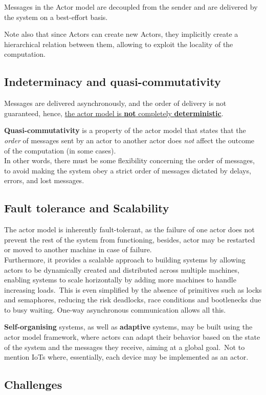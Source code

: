 Messages in the Actor model are decoupled from the sender and are delivered by the system on a best-effort basis.


Note also that since Actors can create new Actors, they implicitly create a hierarchical relation between them, allowing to exploit the locality of the computation.

\subsection{Indeterminacy and quasi-commutativity}
Messages are delivered asynchronously, and the order of delivery is not guaranteed, hence, \ul{the actor model is \textbf{not} completely \textbf{deterministic}}.

\textbf{Quasi-commutativity} is a property of the actor model that states that the \textit{order} of messages sent by an actor to another actor does \textit{not} affect the outcome of the computation (in some cases).\\
In other words, there must be some flexibility concerning the order of messages, to avoid making the system obey a strict order of messages dictated by delays, errors, and lost messages.

\subsection{Fault tolerance and Scalability}
The actor model is inherently fault-tolerant, as the failure of one actor does not prevent the rest of the system from functioning, besides, actor may be restarted or moved to another machine in case of failure.\\
Furthermore, it provides a scalable approach to building systems by allowing actors to be dynamically created and distributed across multiple machines, enabling systems to scale horizontally by adding more machines to handle increasing loads.\
This is even simplified by the absence of primitives such as locks and semaphores, reducing the risk deadlocks, race conditions and bootlenecks due to busy waiting.
One-way asynchronous communication allows all this.

\textbf{Self-organising} systems, as well as \textbf{adaptive} systems, may be built using the actor model framework, where actors can adapt their behavior based on the state of the system and the messages they receive, aiming at a global goal.\
Not to mention IoTs where, essentially, each device may be implemented as an actor.

\subsection{Challenges}

